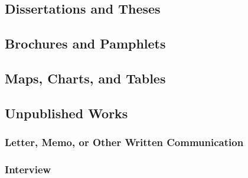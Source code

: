 \documentclass{ltxdockit}
\begin{document}
\subsection{Dissertations and Theses} %
\label{sec:dissertations_and_theses}
\begin{refsection}
	\printbibliography[heading=none]
\end{refsection}

\subsection{Brochures and Pamphlets} %
\label{sec:brochures_and_pamphlets}
\begin{refsection}
	\printbibliography[heading=none]
\end{refsection}

\subsection{Maps, Charts, and Tables} %
\label{sec:maps_charts_and_tables}
\begin{refsection}
	\printbibliography[heading=none]
\end{refsection}

\subsection{Unpublished Works} %
\label{sec:unpublished_works}
\subsubsection{Letter, Memo, or Other Written Communication} %
\label{sub:letter_memo_or_other_written_communication}
\begin{refsection}
	\printbibliography[heading=none]
\end{refsection}
\subsubsection{Interview} %
\label{sub:interview}
\begin{refsection}
	\printbibliography[heading=none]
\end{refsection}
\end{document}
